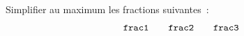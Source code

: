 \documentclass[exercice]{thedocument}%
\begin{document}
%
Simplifier au maximum les fractions suivantes~:
$$\<frac1;\qquad\<frac2;\qquad\<frac3;$$
\end{document}
